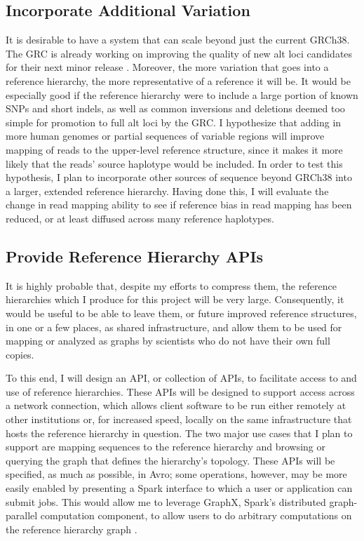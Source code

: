 \documentclass[11pt,proposal]{ucthesis}
\begin{document}
\subsection{Incorporate Additional Variation}

It is desirable to have a system that can scale beyond just the current GRCh38. The GRC is already working on improving the quality of new alt loci candidates for their next minor release \cite{church2014story}. Moreover, the more variation that goes into a reference hierarchy, the more representative of a reference it will be. It would be especially good if the reference hierarchy were to include a large portion of known SNPs and short indels, as well as common inversions and deletions deemed too simple for promotion to full alt loci by the GRC. I hypothesize that adding in more human genomes or partial sequences of variable regions will improve mapping of reads to the upper-level reference structure, since it makes it more likely that the reads' source haplotype would be included. In order to test this hypothesis, I plan to incorporate other sources of sequence beyond GRCh38 into a larger, extended reference hierarchy. Having done this, I will evaluate the change in read mapping ability to see if reference bias in read mapping has been reduced, or at least diffused across many reference haplotypes.

\subsection{Provide Reference Hierarchy APIs}

It is highly probable that, despite my efforts to compress them, the reference hierarchies which I produce for this project will be very large. Consequently, it would be useful to be able to leave them, or future improved reference structures, in one or a few places, as shared infrastructure, and allow them to be used for mapping or analyzed as graphs by scientists who do not have their own full copies.

To this end, I will design an API, or collection of APIs, to facilitate access to and use of reference hierarchies. These APIs will be designed to support access across a network connection, which allows client software to be run either remotely at other institutions or, for increased speed, locally on the same infrastructure that hosts the reference hierarchy in question. The two major use cases that I plan to support are mapping sequences to the reference hierarchy and browsing or querying the graph that defines the hierarchy's topology. These APIs will be specified, as much as possible, in Avro; some operations, however, may be more easily enabled by presenting a Spark interface to which a user or application can submit jobs. This would allow me to leverage GraphX, Spark's distributed graph-parallel computation component, to allow users to do arbitrary computations on the reference hierarchy graph \cite{xin2013graphx}.
\end{document}
